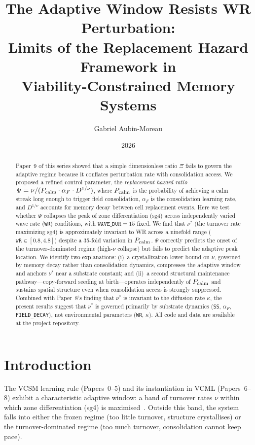 \documentclass[11pt]{article}
\title{%
  The Adaptive Window Resists WR Perturbation:\\
  Limits of the Replacement Hazard Framework in\\
  Viability-Constrained Memory Systems%
}
\author{Gabriel Aubin-Moreau}
\date{2026}
\begin{document}
\maketitle

\begin{abstract}
Paper~9 of this series showed that a simple dimensionless ratio $\Xi$ fails to govern
the adaptive regime because it conflates perturbation rate with consolidation access.
We proposed a refined control parameter, the \emph{replacement hazard ratio}
$\Psi = \nu / (P_{\rm calm} \cdot \alpha_F \cdot D^{1/\nu})$,
where $P_{\rm calm}$ is the probability of achieving a calm streak long enough to trigger
field consolidation, $\alpha_F$ is the consolidation learning rate, and
$D^{1/\nu}$ accounts for memory decay between cell replacement events.
Here we test whether $\Psi$ collapses the peak of zone differentiation (sg4) across
independently varied wave rate (\texttt{WR}) conditions, with $\texttt{WAVE\_DUR}=15$
fixed.
We find that $\nu^*$ (the turnover rate maximizing sg4) is approximately invariant
to WR across a ninefold range ($\texttt{WR} \in [0.8, 4.8]$) despite a 35-fold
variation in $P_{\rm calm}$.
$\Psi$ correctly predicts the onset of the turnover-dominated regime (high-$\nu$
collapse) but fails to predict the adaptive peak location.
We identify two explanations: (i)~a crystallization lower bound on $\nu$, governed
by memory decay rather than consolidation dynamics, compresses the adaptive window
and anchors $\nu^*$ near a substrate constant; and (ii)~a second structural
maintenance pathway---copy-forward seeding at birth---operates independently of
$P_{\rm calm}$ and sustains spatial structure even when consolidation access is
strongly suppressed.
Combined with Paper~8's finding that $\nu^*$ is invariant to the diffusion rate
$\kappa$, the present results suggest that $\nu^*$ is governed primarily by
substrate dynamics (\texttt{SS}, $\alpha_F$, \texttt{FIELD\_DECAY}), not
environmental parameters (\texttt{WR}, $\kappa$).
All code and data are available at the project repository.
\end{abstract}

\section{Introduction}

The VCSM learning rule (Papers~0--5) and its instantiation in VCML (Papers~6--8)
exhibit a characteristic adaptive window: a band of turnover rates $\nu$ within
which zone differentiation (sg4) is maximised~\cite{paper7}.
Outside this band, the system falls into either the frozen regime (too little
turnover, structure crystallises) or the turnover-dominated regime (too much
turnover, consolidation cannot keep pace).
\end{document}
